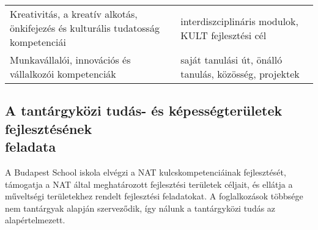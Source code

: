 \begin{longtable}[]{@{}ll@{}}
\begin{minipage}[t]{0.56\columnwidth}
Kreativitás, a kreatív alkotás, önkifejezés és kulturális tudatosság
kompetenciái\strut
\end{minipage} & \begin{minipage}[t]{0.38\columnwidth}\raggedright
interdiszciplináris modulok, KULT fejlesztési cél\strut
\end{minipage}\tabularnewline
\begin{minipage}[t]{0.56\columnwidth}\raggedright
Munkavállalói, innovációs és vállalkozói kompetenciák\strut
\end{minipage} & \begin{minipage}[t]{0.38\columnwidth}\raggedright
saját tanulási út, önálló tanulás, közösség, projektek\strut
\end{minipage}\tabularnewline
\bottomrule
\end{longtable}

\hypertarget{a-tantargykozi-tudas--es-kepessegteruletek-fejlesztesenek-feladata}{%
\subsection{A tantárgyközi tudás- és képességterületek fejlesztésének\\
feladata}\label{a-tantargykozi-tudas--es-kepessegteruletek-fejlesztesenek-feladata}}

A Budapest School iskola elvégzi a NAT kulcskompetenciáinak
fejlesztését, támogatja a NAT által meghatározott fejlesztési területek
céljait, és ellátja a műveltségi területekhez rendelt fejlesztési
feladatokat. A foglalkozások többsége nem tantárgyak alapján
szerveződik, így nálunk a tantárgyközi tudás az alapértelmezett.

